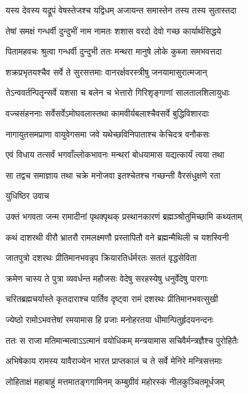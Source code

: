 \twolineshloka
{यस्य देवस्य यद्रूपं वेषस्तेजश्च यद्विधम्}
{अजायन्त समास्तेन तस्य तस्य सुतास्तदा}


\twolineshloka
{तेषां समक्षं गन्धर्वी दुन्दुभीं नाम नामतः}
{शशास वरदो देवो गच्छ कार्यार्थसिद्धये}


\twolineshloka
{पितामहवचः श्रुत्वा गन्धर्वी दुन्दुभी ततः}
{मन्थरा मानुषे लोके कुब्जा समभवत्तदा}


\twolineshloka
{शक्रप्रभृतयश्चैव सर्वे ते सुरसत्तमाः}
{वानरर्क्षवरस्त्रीषु जनयामासुरात्मजान्}


\twolineshloka
{तेऽन्ववर्तन्पितॄन्सर्वे यशसा च बलेन च}
{भेत्तारो गिरिशृङ्गाणां सालतालशिलायुधाः}


\twolineshloka
{वज्चसंहननाः सर्वेसर्वेऽमोघवलास्तथा}
{कामवीर्यबलाश्चैवसर्वे बुद्धिविशारदाः}


\twolineshloka
{नागायुतसमप्राणा वायुवेगसमा जवे}
{यथेच्छविनिपाताश्च केचिदत्र वनौकसः}


\twolineshloka
{एवं विधाय तत्सर्वं भगवाँल्लोकभावनः}
{मन्थरां बोधयामास यद्यत्कार्यं त्वया तथा}


\twolineshloka
{सा तद्वच समाज्ञाय तथा चक्रे मनोजवा}
{इतश्चेतश्च गच्छन्ती वैरसंधुक्षणे रता}


\twolineshloka
{युधिष्ठिर उवाच}
{}


\twolineshloka
{उक्तं भगवता जन्म रामादीनां पृथक्पृथक्}
{प्रस्थानकारणं ब्रह्मञ्श्रोतुमिच्छामि कथ्यताम्}


\twolineshloka
{कथं दाशरथी वीरौ भ्रातरौ रामलक्ष्मणौ}
{प्रस्तापितौ वने ब्रह्मन्मैथिली च यशस्विनी}



\twolineshloka
{जातपुत्रो दशरथः प्रीतिमानभवन्नृप}
{क्रियारतिर्धर्मरतः सततं वृद्धसेविता}


\twolineshloka
{क्रमेण चास्य ते पुत्रा व्यवर्धन्त महौजसः}
{वेदेषु सरहस्येषु धनुर्वेदेषु पारगाः}


\twolineshloka
{चरितब्रह्मचर्यास्ते कृतदाराश्च पार्तिव}
{दृष्ट्वा रामं दशरथः प्रीतिमानभवत्सुखी}


\twolineshloka
{ज्येष्ठो रामोऽभवत्तेषां रमयामास हि प्रजाः}
{मनोहरतया धीमान्पितुर्हृदयनन्दनः}


\twolineshloka
{ततः स राजा मतिमान्मत्वाऽऽत्मानं वयोधिकम्}
{मन्त्रयामास सचिवैर्मन्त्रज्ञैश्च पुरोहितैः}


\twolineshloka
{अभिषेकाय रामस्य यावैराज्येन भारत}
{प्राप्तकालं च ते सर्वे मेनिरे मन्त्रिसत्तमाः}


\twolineshloka
{लोहिताक्षं महाबाहुं मत्तमातङ्गगामिनम्}
{कम्बुग्रीवं महोरस्कं नीलकुञ्चितमूर्धजम्}


